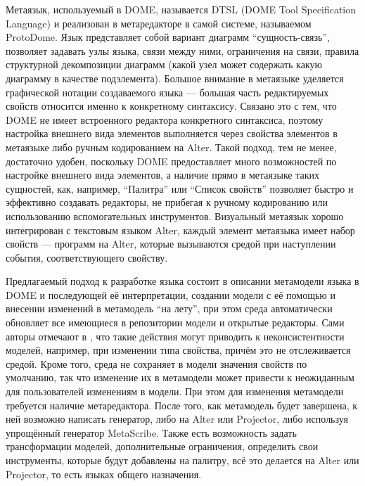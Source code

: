 Метаязык, используемый в DOME, называется DTSL (DOME Tool Specification Language) и реализован в 
метаредакторе в самой системе, называемом ProtoDome. Язык представляет собой вариант диаграмм "`сущность-связь"', позволяет задавать узлы языка,
связи между ними, ограничения на связи, правила структурной декомпозиции диаграмм
(какой узел может содержать какую диаграмму в качестве подэлемента). Большое внимание
в метаязыке уделяется графической нотации создаваемого языка --- большая часть редактируемых свойств
относится именно к конкретному синтаксису. Связано это с тем, что DOME не имеет встроенного
редактора конкретного синтаксиса, поэтому настройка внешнего вида элементов выполняется через
свойства элементов в метаязыке либо ручным кодированием на Alter. Такой подход, тем не менее,
достаточно удобен, поскольку DOME предоставляет много возможностей по настройке внешнего вида элементов,
а наличие прямо в метаязыке таких сущностей, как, например, "`Палитра"' или "`Список свойств"' позволяет быстро
и эффективно создавать редакторы, не прибегая к ручному кодированию или использованию вспомогательных
инструментов. Визуальный метаязык хорошо интегрирован с текстовым языком Alter, каждый
элемент метаязыка имеет набор свойств --- программ на Alter, которые вызываются средой при 
наступлении события, соответствующего свойству.

Предлагаемый подход к разработке языка состоит в описании метамодели языка в DOME и последующей
её интерпретации, создании модели с её помощью и внесении изменений в метамодель "`на лету"',
при этом среда автоматически обновляет все имеющиеся в репозитории модели и открытые редакторы.
Сами авторы отмечают в \cite{guide1999honeywell}, что такие действия могут приводить к 
неконсистентности моделей, например, при изменении типа свойства, причём это не отслеживается средой.
Кроме того, среда не сохраняет в модели значения свойств по умолчанию, так что изменение их в
метамодели может привести к неожиданным для пользователей изменениям в модели. При
этом для изменения метамодели требуется наличие метаредактора. После того, как метамодель
будет завершена, к ней возможно написать генератор, либо на Alter или Projector, либо используя
упрощённый генератор MetaScribe. Также есть возможность задать трансформации моделей, 
дополнительные ограничения, определить свои инструменты, которые будут добавлены на палитру,
всё это делается на Alter или Projector, то есть языках общего назначения.

